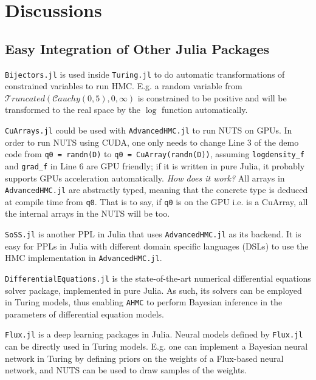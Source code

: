 \documentclass[tablecaption=bottom,wcp]{jmlr} %
\begin{document}
\section{Discussions}
\subsection{Easy Integration of Other Julia Packages}
\texttt{Bijectors.jl} is used inside \texttt{Turing.jl} to do automatic transformations of constrained variables to run HMC.
E.g. a random variable from $\mathcal{T}runcated(\mathcal{C}auchy(0, 5), 0, \infty)$ is constrained to be positive and 
will be transformed to the real space by the $\log$ function automatically. 

\texttt{CuArrays.jl} could be used with \texttt{AdvancedHMC.jl} to run NUTS on GPUs.
In order to run NUTS using CUDA, 
one only needs to change Line 3 of the demo code 
from \texttt{q0 = randn(D)} to \texttt{q0 = CuArray(randn(D))}, 
assuming \texttt{logdensity\_f} and \texttt{grad\_f} in Line 6 are GPU friendly;
if it is written in pure Julia, it probably supports GPUs acceleration automatically.
\textit{How does it work?}
All arrays in \texttt{AdvancedHMC.jl} are abstractly typed, meaning that the concrete type is deduced at compile time from \texttt{q0}. That is to say, if \texttt{q0} is on the GPU i.e. is a CuArray, all the internal arrays in the NUTS will be too.

\texttt{SoSS.jl} is another PPL in Julia that
uses \texttt{AdvancedHMC.jl} as its backend.
It is easy for PPLs in Julia with different domain specific languages (DSLs)
to use the HMC implementation in \texttt{AdvancedHMC.jl}.

\texttt{DifferentialEquations.jl} is the state-of-the-art numerical differential equations solver package, implemented in pure Julia. As such, its solvers can be employed in Turing models, thus enabling \texttt{AHMC} to perform Bayesian inference in the parameters of differential equation models.

\texttt{Flux.jl} is a deep learning packages in Julia.
Neural models defined by \texttt{Flux.jl} can be directly used in Turing models.
E.g. one can implement a Bayesian neural network in Turing by 
defining priors on the weights of a Flux-based neural network, and 
NUTS can be used to draw samples of the weights.






\newpage

\appendix
\end{document}
